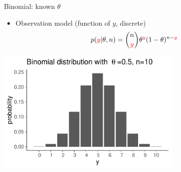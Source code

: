 \documentclass[english,t]{beamer}
\begin{document}
\begin{frame}{Binomial: known $\theta$}

  \begin{itemize}
  \item {\color{blue}Observation model} (function of {\color{red} $y$}, discrete)
    \begin{align*}
      p({\color{red}y}|\theta,n) = \binom{n}{{\color{red}y}} \theta^{\color{red}y}(1-\theta)^{n-{\color{red}y}}
    \end{align*}
  \end{itemize}

  \begin{center}
    {\includegraphics[width=9cm]{dbinom10.pdf}\\
      \vspace{-0.6\baselineskip}
      }
  \end{center}
\end{frame}
\end{document}
